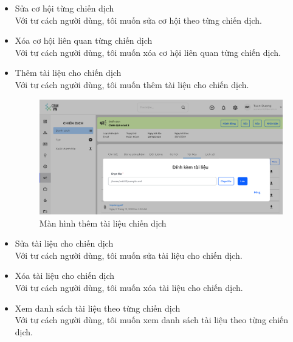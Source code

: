 \documentclass[12pt,a4paper]{article}
\begin{document}
\begin{enumerate}
\begin{itemize}
            \item Sửa cơ hội từng chiến dịch\\
            Với tư cách người dùng, tôi muốn sửa cơ hội theo từng chiến dịch.

            \item Xóa cơ hội liên quan từng chiến dịch \\
            Với tư cách người dùng, tôi muốn xóa cơ hội liên quan từng chiến dịch.


            \item Thêm tài liệu cho chiến dịch \\
            Với tư cách người dùng, tôi muốn thêm tài liệu cho chiến dịch.

            \begin{figure}[H]
                \centering \includegraphics[width=\textwidth]{Img/Nguyet/Chiendich/themtailieucd.png}
                \vspace{0.5cm}
                \caption{Màn hình thêm tài liệu chiến dịch }
                \label{themtlchiendich}
            \end{figure}

            \item Sửa tài liệu cho chiến dịch \\
            Với tư cách người dùng, tôi muốn sửa tài liệu cho chiến dịch.

            \item Xóa tài liệu cho chiến dịch \\
            Với tư cách người dùng, tôi muốn xóa tài liệu cho chiến dịch.

            \item Xem danh sách tài liệu theo từng chiến dịch \\
            Với tư cách người dùng, tôi muốn xem danh sách tài liệu theo từng chiến dịch.


\end{itemize}
\end{enumerate}
\end{document}
